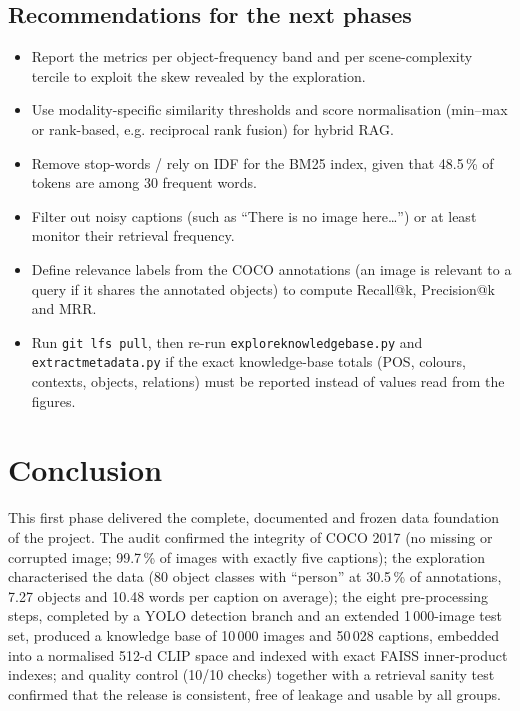 \documentclass[11pt,a4paper]{article}
\renewcommand{\_}{\textunderscore\allowbreak{}}
\newcommand{\code}[1]{\texttt{#1}}
\begin{document}
\subsection{Recommendations for the next phases}
\begin{itemize}[nosep]
  \item Report the metrics per object-frequency band and per scene-complexity tercile to exploit the skew revealed by the exploration.
  \item Use modality-specific similarity thresholds and score normalisation (min--max or rank-based, e.g. reciprocal rank fusion) for hybrid RAG.
  \item Remove stop-words / rely on IDF for the BM25 index, given that 48.5\,\% of tokens are among 30 frequent words.
  \item Filter out noisy captions (such as ``There is no image here\dots'') or at least monitor their retrieval frequency.
  \item Define relevance labels from the COCO annotations (an image is relevant to a query if it shares the annotated objects) to compute Recall@k, Precision@k and MRR.
  \item Run \code{git lfs pull}, then re-run \code{explore\_knowledge\_base.py} and \code{extract\_metadata.py} if the exact knowledge-base totals (POS, colours, contexts, objects, relations) must be reported instead of values read from the figures.
\end{itemize}

\section{Conclusion}
This first phase delivered the complete, documented and frozen data foundation of the project. The audit confirmed the integrity of COCO 2017 (no missing or corrupted image; 99.7\,\% of images with exactly five captions); the exploration characterised the data (80 object classes with ``person'' at 30.5\,\% of annotations, 7.27 objects and 10.48 words per caption on average); the eight pre-processing steps, completed by a YOLO detection branch and an extended 1\,000-image test set, produced a knowledge base of 10\,000 images and 50\,028 captions, embedded into a normalised 512-d CLIP space and indexed with exact FAISS inner-product indexes; and quality control (10/10 checks) together with a retrieval sanity test confirmed that the release is consistent, free of leakage and usable by all groups. 
\end{document}
